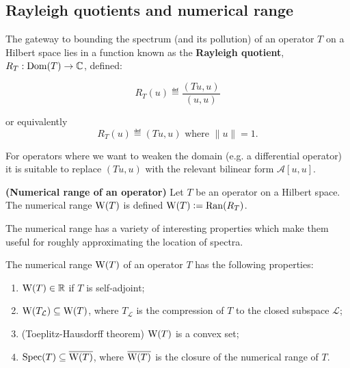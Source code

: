 \documentclass[../main.tex]{subfiles}
\begin{document}
\subsection{Rayleigh quotients and numerical range}
The gateway to bounding the spectrum (and its pollution) of an operator $T$ on a Hilbert space lies in a function known as the \textbf{Rayleigh quotient}, $R_T: \mathrm{Dom}(T) \rightarrow \mathbb{C}$, defined:

 \begin{equation*}
 R_T(u) \eqdef \frac{( Tu, u )}{(u, u)}
 \end{equation*}
 
 or equivalently
 \begin{equation*}
 R_T(u) \eqdef ( Tu, u )\text{ where } \|u\| = 1.
 \end{equation*}
 
 For operators where we want to weaken the domain (e.g. a differential operator) it is suitable to replace $(Tu, u)$ with the relevant bilinear form $\mathcal{A}[u, u].$

\begin{definition}{\textbf{(Numerical range of an operator)}} Let $T$ be an operator on a Hilbert space. The
numerical range $\mathrm{W}(T)$ is defined $\mathrm{W}(T) \mathrel{\mathop:}= \mathrm{Ran}(R_T)$.
\end{definition}

The numerical range has a variety of interesting properties which make them useful for roughly approximating
the location of spectra.

\begin{proposition}\label{thm:num-range-props}
The numerical range $\mathrm{W}(T)$ of an operator $T$ has the following properties:
\begin{enumerate}
\item\label{item:num-in-R} $\mathrm{W}(T) \in \mathbb{R}$ if $T$ is self-adjoint;
\item\label{item:proj-num-range} $\mathrm{W}(T_\mathcal{L}) \subseteq \mathrm{W}(T)$, where $T_\mathcal{L}$ is the compression of $T$ to the closed subspace $\mathcal{L}$;
\item (Toeplitz-Hausdorff theorem)\label{item:toeplitz-hausdorff} $\mathrm{W}(T)$ is a convex set;
\item\label{item:spec-in-num} $\mathrm{Spec}(T) \subseteq \overline{\mathrm{W}(T)}$, where $\overline{\mathrm{W}(T)}$ is the closure of the numerical range of $T$.
\end{enumerate}
\end{proposition}
\end{document}
